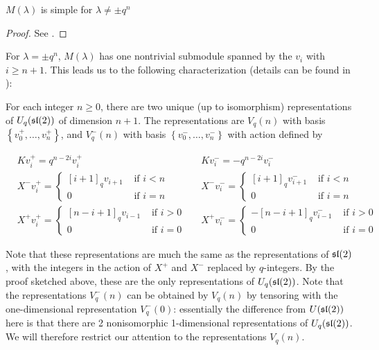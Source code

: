 \begin{claim}
    $M(\lambda)$ is simple for $\lambda \neq \pm q^n$
\end{claim}

\begin{proof}
    See \cite{Jantzen1995}.
\end{proof}

For $\lambda = \pm q^{n}$, $M(\lambda)$ has one nontrivial submodule spanned by the $v_i$ with $i \geq n+1$.
This leads us to the following characterization (details can be found in \cite{Jantzen1995}):


For each integer $n \geq 0$, there are two unique (up to isomorphism)
representations of $U_q(\mathfrak{sl}(2))$ of dimension $n+1$. 
The representations are $V_q(n)$ with basis $\left\{ v^+_0, \ldots, v^+_n
\right\}$, and $V_q^-(n)$ with basis $\left\{ v^-_0, \ldots, v^-_n \right\}$
with action defined by 

\begin{align*}
    &K v^+_i = q^{n-2i} v^+_i  &
    &K v^-_i = -q^{n-2i} v^-_i \\
    &X^- v^+_i = \begin{cases} [i+1]_qv_{i+1}& \text{ if $i < n$} \\ 0& \text{ if $i = n$} \end{cases} &
    &X^- v^-_i = \begin{cases} [i+1]_qv^-_{i+1}& \text{ if $i < n$} \\ 0& \text{ if $i = n$} \end{cases} \\
    & X^+  v^+_i = \begin{cases} 
                     [n-i+1]_qv_{i-1}& \text{ if $i > 0$} \\ 
                    0& \text{ if $i = 0$} 
             \end{cases} &
    & X^+  v^-_i = \begin{cases} 
                    -[n-i+1]_q v^-_{i-1}& \text{ if $i > 0$} \\ 
                    0& \text{ if $i = 0$} 
             \end{cases}
\end{align*}

Note that these representations are much the same as the representations of
$\mathfrak{sl}(2)$, with the integers in the action of $X^+$ and $X^-$ replaced by
$q$-integers.
By the proof sketched above, these are the only representations of
$U_q(\mathfrak{sl}(2))$.  Note that the representations $V_q^-(n)$ can be obtained by
$V_q(n)$ by tensoring with the one-dimensional representation $V_q^-(0)$:
essentially the difference from $U(\mathfrak{sl}(2))$ here is that there are 2
nonisomorphic 1-dimensional representations of $U_q(\mathfrak{sl}(2))$. We will therefore
restrict our attention to the representations $V_q(n)$.

